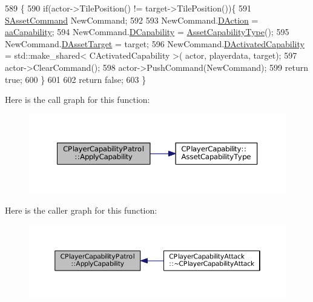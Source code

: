 \begin{DoxyCode}
589                                                                                                            
                                                          \{
590     \textcolor{keywordflow}{if}(actor->TilePosition() != target->TilePosition())\{
591         \hyperlink{structSAssetCommand}{SAssetCommand} NewCommand;
592         
593         NewCommand.\hyperlink{structSAssetCommand_a8edd3b3d59a76d5514ba403bc8076a75}{DAction} = \hyperlink{GameDataTypes_8h_ab47668e651a3032cfb9c40ea2d60d670acf9fb164e8abd71c71f4a8c7fda360d4}{aaCapability};
594         NewCommand.\hyperlink{structSAssetCommand_a734ea7c6847457b437360f333f570ff9}{DCapability} = \hyperlink{classCPlayerCapability_a433bb196cd6ab6a932f1cac102b3aa98}{AssetCapabilityType}();
595         NewCommand.\hyperlink{structSAssetCommand_a3d9b43f6e59c386c48c41a65448a0c39}{DAssetTarget} = target;
596         NewCommand.\hyperlink{structSAssetCommand_ad8beda19520811cc70fe1eab16c774dd}{DActivatedCapability} = std::make\_shared< CActivatedCapability >(
      actor, playerdata, target);
597         actor->ClearCommand();
598         actor->PushCommand(NewCommand);
599         \textcolor{keywordflow}{return} \textcolor{keyword}{true};
600     \}
601 
602     \textcolor{keywordflow}{return} \textcolor{keyword}{false};
603 \}
\end{DoxyCode}
Here is the call graph for this function\+:\nopagebreak
\begin{figure}[H]
\begin{center}
\leavevmode
\includegraphics[width=350pt]{classCPlayerCapabilityPatrol_a6b9e361d99e256efadcd99a829f93f51_cgraph}
\end{center}
\end{figure}
Here is the caller graph for this function\+:\nopagebreak
\begin{figure}[H]
\begin{center}
\leavevmode
\includegraphics[width=350pt]{classCPlayerCapabilityPatrol_a6b9e361d99e256efadcd99a829f93f51_icgraph}
\end{center}
\end{figure}
\hypertarget{classCPlayerCapabilityPatrol_a63c099d931e1e57db01120db7b1fdbe4}{}\label{classCPlayerCapabilityPatrol_a63c099d931e1e57db01120db7b1fdbe4} 
